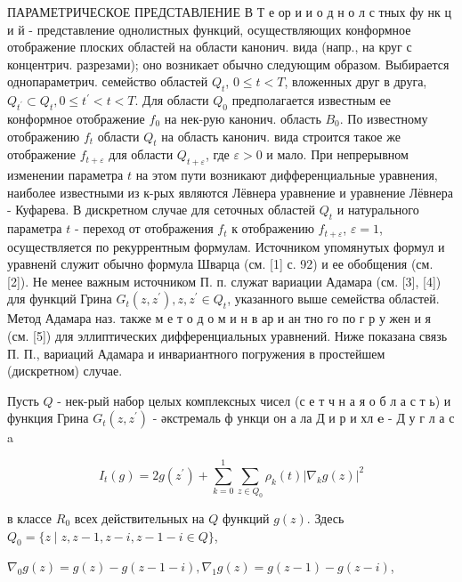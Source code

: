 \documentclass[10pt]{article}
\begin{document}
ПАРАМЕТРИЧЕСКОЕ ПРЕДСТАВЛЕНИЕ В Т е ор и и о д н о л с тных фу нк ц и й - представление однолистных функций, осуществляющих конформное отображение плоских областей на области канонич. вида (напр., на круг с концентрич. разрезами); оно возникает обычно следующим образом. Выбирается однопараметрич. семейство областей $Q_{t}$, $0 \leqslant t<T$, вложенных друг в друга, $Q_{t^{\prime}} \subset Q_{t}, 0 \leqslant t^{\prime}<t<T$. Для области $Q_{0}$ предполагается известным ее конформное отображение $f_{0}$ на нек-рую канонич. область $B_{0}$. По известному отображению $f_{t}$ области $Q_{t}$ на область канонич. вида строится такое же отображение $f_{t+\varepsilon}$ для области $Q_{t+\varepsilon}$, где $\varepsilon>0$ и мало. При непрерывном изменении параметра $t$ на этом пути возникают дифференциальные уравнения, наиболее известными из к-рых являются Лёвнера уравнение и уравнение Лёвнера - Куфарева. В дискретном случае для сеточных областей $Q_{t}$ и натурального параметра $t$ - переход от отображения $f_{t}$ к отображению $f_{t+\varepsilon}$, $\varepsilon=1$, осуществляется по рекуррентным формулам. Источником упомянутых формул и уравненй служит обычно формула Шварца (см. [1] с. 92) и ее обобщения (см. [2]). Не менее важным источником П. п. служат вариации Адамара (см. [3], [4]) для функций Грина $G_{t}\left(z, z^{\prime}\right), z, z^{\prime} \in Q_{t}$, указанного выше семейства областей. Метод Адамара наз. также м е т о д о м и н в ар и ан тно го по г р у жен и я (см. [5]) для эллиптических дифференциальных уравнений. Ниже показана связь П. П., вариаций Адамара и инвариантного погружения в простейшем (дискретном) случае.



Пусть $Q$ - нек-рый набор целых комплексных чисел (с е т ч н а я о б л а с т ь) и функция Грина $G_{t}\left(z, z^{\prime}\right)$ - әкстремаль ф ункци он а ла Д и р и хл $\mathbf{e}$ - Д у г л а с a



\[

I_{t}(g)=2 g\left(z^{\prime}\right)+\sum_{k=0}^{1} \sum_{z \in Q_{0}} \rho_{k}(t)\left|\nabla_{k} g(z)\right|^{2}

\]



в классе $R_{0}$ всех действительных на $Q$ функций $g(z)$. Здесь $Q_{0}=\{z \mid z, z-1, z-i, z-1-i \in Q\}$,



$\nabla_{0} g(z)=g(z)-g(z-1-i), \nabla_{1} g(z)=g(z-1)-g(z-i)$,
\end{document}

